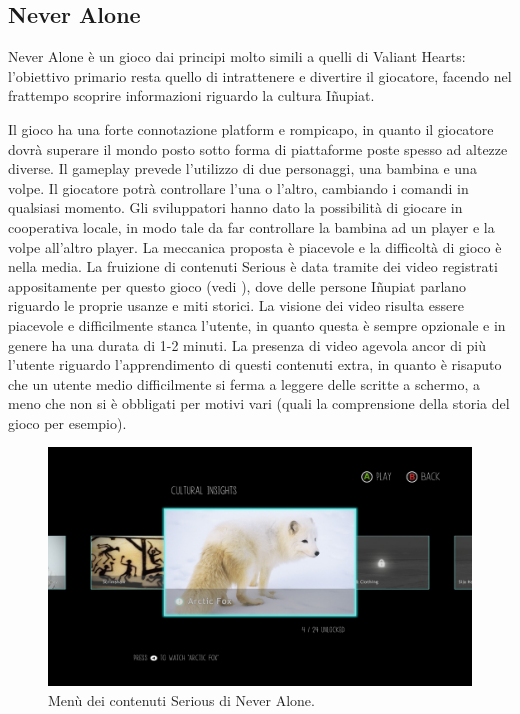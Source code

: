 \subsection{Never Alone}

Never Alone è un gioco dai principi molto simili a quelli di Valiant Hearts: l'obiettivo primario resta quello di intrattenere e divertire il giocatore, facendo nel frattempo scoprire informazioni riguardo la cultura Iñupiat.

Il gioco ha una forte connotazione platform e rompicapo, in quanto il giocatore dovrà superare il mondo posto sotto forma di piattaforme poste spesso ad altezze diverse. Il gameplay prevede l'utilizzo di due personaggi, una bambina e una volpe. Il giocatore potrà controllare l'una o l'altro, cambiando i comandi in qualsiasi momento. Gli sviluppatori hanno dato la possibilità di giocare in cooperativa locale, in modo tale da far controllare la bambina ad un player e la volpe all'altro player.
La meccanica proposta è piacevole e la difficoltà di gioco è nella media. La fruizione di contenuti Serious è data tramite dei video registrati appositamente per questo gioco (vedi \myfig{\ref{fig:videona}}), dove delle persone Iñupiat parlano riguardo le proprie usanze e miti storici. La visione dei video risulta essere piacevole e difficilmente stanca l'utente, in quanto questa è sempre opzionale e in genere ha una durata di 1-2 minuti. La presenza di video agevola ancor di più l'utente riguardo l'apprendimento di questi contenuti extra, in quanto è risaputo che un utente medio difficilmente si ferma a leggere delle scritte a schermo, a meno che non si è obbligati per motivi vari (quali la comprensione della storia del gioco per esempio).

\begin{figure}[h]
\centerline{\includegraphics[scale=0.22]{images/statoarte/videona.jpg}}
\caption{Menù dei contenuti Serious di Never Alone.}
\label{fig:videona}
\end{figure}

